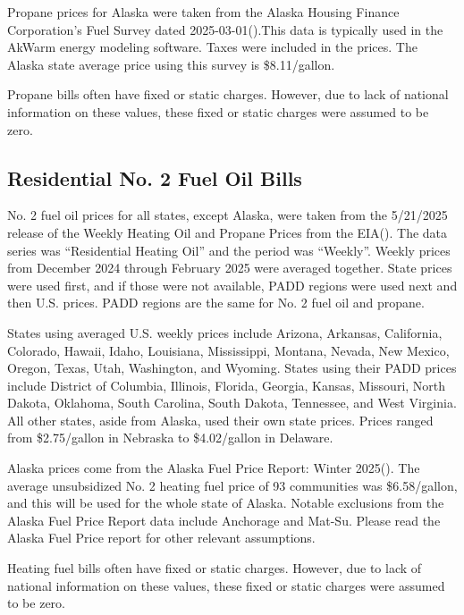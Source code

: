 Propane prices for Alaska were taken from the Alaska Housing Finance Corporation's Fuel Survey dated 2025-03-01(\cite{AHFC_survey}).This data is typically used in the AkWarm energy modeling software. Taxes were included in the prices. The Alaska state average price using this survey is \$8.11/gallon.

Propane bills often have fixed or static charges. However, due to lack of national information on these values, these fixed or static charges were assumed to be zero.

\subsection{Residential No. 2 Fuel Oil Bills}
No. 2 fuel oil prices for all states, except Alaska, were taken from the 5/21/2025 release of the Weekly Heating Oil and Propane Prices from the EIA(\cite{EIA_fuel_oil_prices}). The data series was “Residential Heating Oil” and the period was “Weekly”. Weekly prices from December 2024 through February 2025 were averaged together. State prices were used first, and if those were not available, PADD regions were used next and then U.S. prices. PADD regions are the same for No. 2 fuel oil and propane.

States using averaged U.S. weekly prices include Arizona, Arkansas, California, Colorado, Hawaii, Idaho, Louisiana, Mississippi, Montana, Nevada, New Mexico, Oregon, Texas, Utah, Washington, and Wyoming. States using their PADD prices include District of Columbia, Illinois, Florida, Georgia, Kansas, Missouri, North Dakota, Oklahoma, South Carolina, South Dakota, Tennessee, and West Virginia. All other states, aside from Alaska, used their own state prices. Prices ranged from \$2.75/gallon in Nebraska to \$4.02/gallon in Delaware.

Alaska prices come from the Alaska Fuel Price Report: Winter 2025(\cite{AK_community_affairs}). The average unsubsidized No. 2 heating fuel price of 93 communities was \$6.58/gallon, and this will be used for the whole state of Alaska. Notable exclusions from the Alaska Fuel Price Report data include Anchorage and Mat-Su. Please read the Alaska Fuel Price report for other relevant assumptions.

Heating fuel bills often have fixed or static charges. However, due to lack of national information on these values, these fixed or static charges were assumed to be zero.

